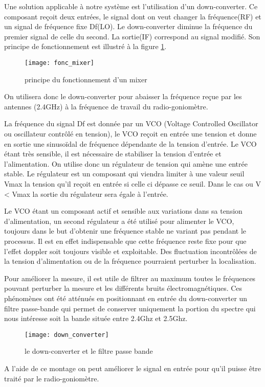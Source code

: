 Une solution applicable à notre système est l'utilisation d'un down-converter. Ce composant reçoit deux entrées, le signal dont on veut changer la fréquence(RF) et un signal de fréquence fixe Df(LO). Le down-converter diminue la fréquence du premier signal de celle du second. La sortie(IF) correspond au signal modifié. Son principe de fonctionnement est illustré à la figure \ref{fig:mix}.



\begin{figure}[h]
  \centering
  \texttt{[image: fonc\_mixer]}
  \caption{principe du fonctionnement d'un mixer}
  \label{fig:mix}
\end{figure}

On utilisera donc le down-converter pour abaisser la fréquence reçue par les antennes (2.4GHz) à la fréquence de travail du radio-goniomètre.

La fréquence du signal Df est donnée par un VCO (Voltage Controlled Oscillator ou oscillateur contrôlé en tension), le VCO reçoit en entrée une tension et donne en sortie une sinusoïdal de fréquence dépendante de la tension d’entrée. Le VCO étant très sensible, il est nécessaire de stabiliser la tension d’entrée et l’alimentation. On utilise donc un régulateur de tension qui amène une entrée stable. Le régulateur est un composant qui viendra limiter à une valeur seuil Vmax la tension qu'il reçoit en entrée si celle ci dépasse ce seuil. Dans le cas ou V < Vmax la sortie du régulateur sera égale à l'entrée.

Le VCO étant un composant actif et sensible aux variations dans sa tension d'alimentation, un second régulateur a été utilisé pour alimenter le VCO, toujours dans le but d’obtenir une fréquence stable ne variant pas pendant le processus. Il est en effet indispensable que cette fréquence reste fixe pour que l’effet doppler soit toujours visible et exploitable. Des fluctuation incontrôlées de la tension d'alimentation ou de la fréquence pourraient perturber la localisation.

Pour améliorer la mesure, il est utile de filtrer au maximum toutes le fréquences pouvant perturber la mesure et les différents bruits électromagnétiques. Ces phénomènes ont été atténués en positionnant en entrée du down-converter un filtre passe-bande qui permet de conserver uniquement la portion du spectre qui nous intéresse soit la bande située entre 2.4Ghz et 2.5Ghz.


\begin{figure}[h]
  \centering
  \texttt{[image: down\_converter]}
  \caption{le down-converter et le filtre passe bande}
  \label{fig:down}
\end{figure}

A l’aide de ce montage on peut améliorer le signal en entrée pour qu'il puisse être traité par le radio-goniomètre.

